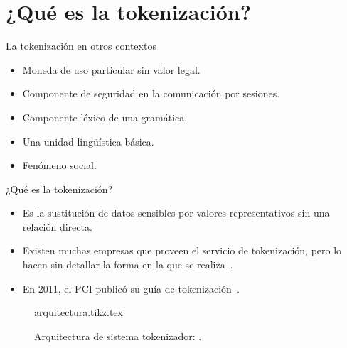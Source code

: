 %
%

\section{¿Qué es la tokenización?}

\begin{frame}{La tokenización en otros contextos}
  \begin{itemize}
    \item Moneda de uso particular sin valor legal.
    \item Componente de seguridad en la comunicación por sesiones.
    \item Componente léxico de una gramática.
    \item Una unidad lingüística básica.
    \item Fenómeno social.
  \end{itemize}
\end{frame}

\begin{frame}{¿Qué es la tokenización?}
  \begin{itemize}
    \item Es la sustitución de datos sensibles por valores representativos
      sin una relación directa.
    \item Existen muchas empresas que proveen el servicio de tokenización,
      pero lo hacen sin detallar la forma en la que se
      realiza~\cite{shif4_uno, braintree_uno, securosis}.
    \item En 2011, el PCI publicó su guía de tokenización~\cite{pci_tokens}.
  \end{itemize}

  \begin{figure}
    \centering
    {arquitectura.tikz.tex}
    \caption{Arquitectura de sistema tokenizador:
      .}
  \end{figure}
\end{frame}
